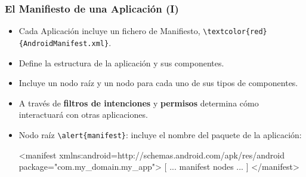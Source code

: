 \documentclass[hyperref={pdfpagelabels=true},ucs]{beamer}
\begin{document}
\begin{frame}[fragile]
\frametitle{El Manifiesto de una Aplicación (I)}  

\begin{itemize}
\item Cada Aplicación incluye un fichero de Manifiesto,
  \Verb|\textcolor{red}{AndroidManifest.xml}|.
\item Define la estructura de la aplicación y sus componentes.
\item Incluye un nodo raíz y un nodo para cada
  uno de sus tipos de componentes.
\item A través de \textbf{filtros de intenciones} y \textbf{permisos}
  determina cómo interactuará con otras aplicaciones.
\item Nodo raíz \Verb|\alert{manifest}|: incluye el nombre del paquete de
  la aplicación:

\begin{tiny}
\begin{block}{}
\begin{xml}
<manifest xmlns:android=http://schemas.android.com/apk/res/android
          package="com.my_domain.my_app">
          [ ... manifest nodes ... ]
</manifest>
\end{xml}
\end{block}
\end{tiny}

\end{itemize}

\end{frame}
\end{document}
